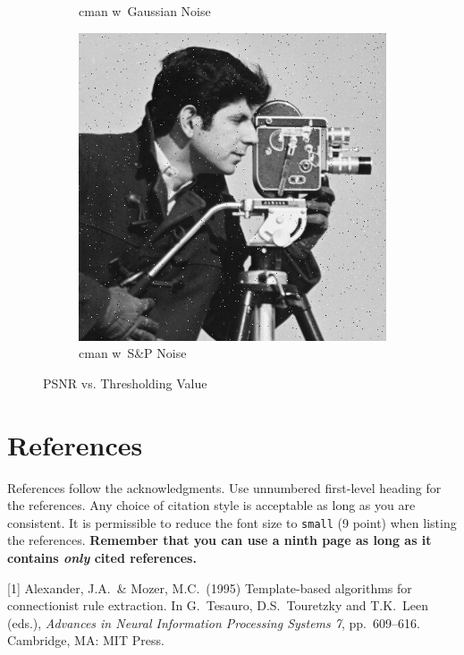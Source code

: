 \documentclass{article}
\begin{document}
\begin{figure}[h!]
\begin{subfigure}[b]{0.45\linewidth}
		\caption{cman w\ Gaussian Noise}
	\end{subfigure}
	\begin{subfigure}[b]{0.45\linewidth}
		\includegraphics[width=\linewidth]{../../2_Software/data/cman_spnoise.png}
		\caption{cman w\ S\&P Noise}
	\end{subfigure}
	\caption{PSNR vs. Thresholding Value}
	\label{fig:psnr_threshold}
\end{figure}




\section*{References}

References follow the acknowledgments. Use unnumbered first-level
heading for the references. Any choice of citation style is acceptable
as long as you are consistent. It is permissible to reduce the font
size to \verb+small+ (9 point) when listing the references. {\bf
  Remember that you can use a ninth page as long as it contains
  \emph{only} cited references.}
\medskip

\small

[1] Alexander, J.A.\ \& Mozer, M.C.\ (1995) Template-based algorithms
for connectionist rule extraction. In G.\ Tesauro, D.S.\ Touretzky and
T.K.\ Leen (eds.), {\it Advances in Neural Information Processing
  Systems 7}, pp.\ 609--616. Cambridge, MA: MIT Press.
\end{document}
